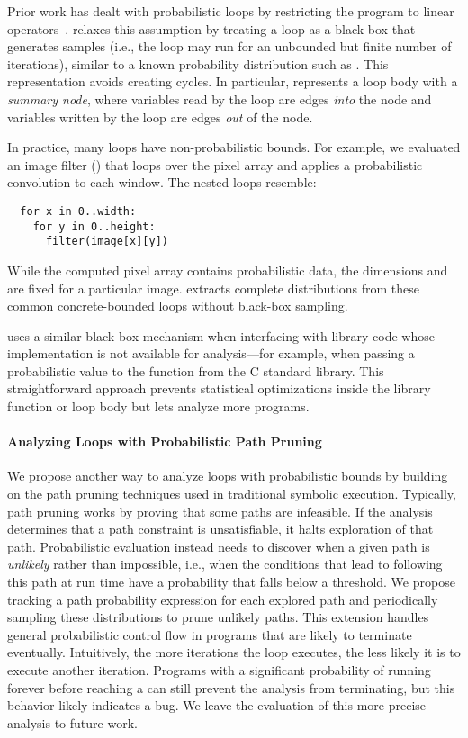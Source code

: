 Prior work has dealt with probabilistic loops by restricting the program
to linear operators~\cite{sriram-pldi}. \tool relaxes this
assumption by treating a loop as a
black box that generates samples (i.e., the loop may run for an
unbounded but finite number of iterations), similar to a known
probability distribution such as .
This representation avoids creating cycles.
In particular, \tool represents a loop body with a
\emph{summary node}, where variables read by the loop are
edges \emph{into} the node and variables written by the loop are edges \emph{out} of the node.

In practice, many loops have
non-probabilistic bounds. For example, we evaluated an image filter
() that loops over the pixel array and applies a probabilistic
convolution to each window. The nested loops resemble:
%
\begin{lstlisting}
  for x in 0..width:
    for y in 0..height:
      filter(image[x][y])
\end{lstlisting}
%
While the computed pixel array contains probabilistic data, the dimensions
 and  are fixed
for a particular image. \tool extracts complete distributions from these common
concrete-bounded loops without black-box sampling.

\tool uses a similar black-box mechanism when interfacing with library code whose
implementation is not available for analysis---for example, when passing a
probabilistic value to the  function from the C standard library.
This straightforward approach prevents statistical optimizations inside the
library function or loop body but lets \tool analyze more programs.

\paragraph{Analyzing Loops with Probabilistic Path Pruning}
We propose another way to analyze loops with probabilistic bounds by
building on the path pruning techniques used in traditional symbolic
execution.  Typically, path pruning works by proving that some paths
are infeasible. If the analysis determines that a path constraint
is unsatisfiable, it halts exploration of that path.  Probabilistic evaluation
instead needs to discover when a given path is \emph{unlikely} rather
than impossible, i.e., when the conditions that lead to following this
path at run time have a probability that falls below a
threshold.  We propose tracking a path probability expression for each
explored path and periodically sampling these distributions to
prune unlikely paths.
This extension handles general probabilistic
control flow in programs that are likely to terminate eventually.
Intuitively, the more iterations the loop
executes, the less likely it is to execute another iteration.
Programs with a significant probability of running forever before
reaching a \passert can still prevent the analysis from terminating,
but this behavior likely indicates a bug.
We leave the evaluation of
this more precise analysis to future work.


